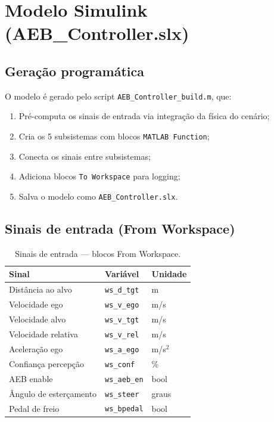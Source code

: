 \documentclass[12pt,a4paper]{article}
\begin{document}
\section{Modelo Simulink (AEB\_Controller.slx)}
\label{sec:simulink}

\subsection{Geração programática}

O modelo é gerado pelo script \texttt{AEB\_Controller\_build.m}, que:
\begin{enumerate}[noitemsep]
    \item Pré-computa os sinais de entrada via integração da física do cenário;
    \item Cria os 5 subsistemas com blocos \texttt{MATLAB Function};
    \item Conecta os sinais entre subsistemas;
    \item Adiciona blocos \texttt{To Workspace} para logging;
    \item Salva o modelo como \texttt{AEB\_Controller.slx}.
\end{enumerate}

\subsection{Sinais de entrada (From Workspace)}

\begin{table}[H]
    \centering
    \caption{Sinais de entrada --- blocos From Workspace.}
    \label{tab:inputs}
    \begin{tabular}{@{}lll@{}}
        \toprule
        Sinal & Variável & Unidade \\
        \midrule
        Distância ao alvo     & \texttt{ws\_d\_tgt}  & m \\
        Velocidade ego        & \texttt{ws\_v\_ego}  & m/s \\
        Velocidade alvo       & \texttt{ws\_v\_tgt}  & m/s \\
        Velocidade relativa   & \texttt{ws\_v\_rel}  & m/s \\
        Aceleração ego        & \texttt{ws\_a\_ego}  & m/s$^2$ \\
        Confiança percepção   & \texttt{ws\_conf}    & \% \\
        AEB enable            & \texttt{ws\_aeb\_en} & bool \\
        Ângulo de esterçamento & \texttt{ws\_steer}  & graus \\
        Pedal de freio        & \texttt{ws\_bpedal}  & bool \\
        \bottomrule
    \end{tabular}
\end{table}
\end{document}
